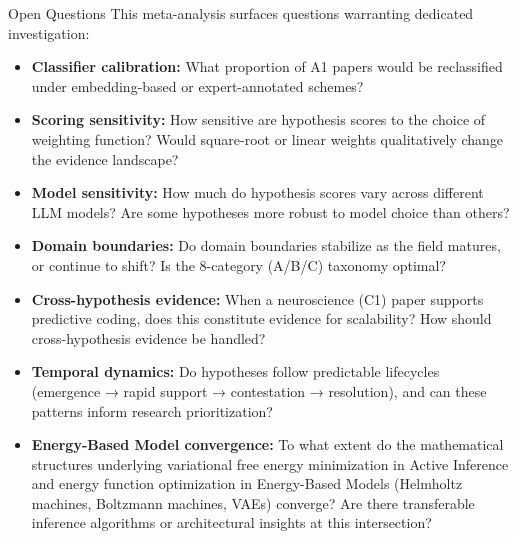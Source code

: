 \documentclass[
  ignorenonframetext,
]{beamer}
\providecommand{\tightlist}{%
  \setlength{\itemsep}{0pt}\setlength{\parskip}{0pt}}
\begin{document}
\begin{frame}{Open Questions}
\protect{}\label{open-questions}
This meta-analysis surfaces questions warranting dedicated
investigation:

\begin{itemize}
\tightlist
\item
  \textbf{Classifier calibration:} What proportion of A1 papers would be
  reclassified under embedding-based or expert-annotated schemes?
\item
  \textbf{Scoring sensitivity:} How sensitive are hypothesis scores to
  the choice of weighting function? Would square-root or linear weights
  qualitatively change the evidence landscape?
\item
  \textbf{Model sensitivity:} How much do hypothesis scores vary across
  different LLM models? Are some hypotheses more robust to model choice
  than others?
\item
  \textbf{Domain boundaries:} Do domain boundaries stabilize as the
  field matures, or continue to shift? Is the 8-category (A/B/C)
  taxonomy optimal?
\item
  \textbf{Cross-hypothesis evidence:} When a neuroscience (C1) paper
  supports predictive coding, does this constitute evidence for
  scalability? How should cross-hypothesis evidence be handled?
\item
  \textbf{Temporal dynamics:} Do hypotheses follow predictable
  lifecycles (emergence → rapid support → contestation → resolution),
  and can these patterns inform research prioritization?
\item
  \textbf{Energy-Based Model convergence:} To what extent do the
  mathematical structures underlying variational free energy
  minimization in Active Inference and energy function optimization in
  Energy-Based Models (Helmholtz machines, Boltzmann machines, VAEs)
  converge? Are there transferable inference algorithms or architectural
  insights at this intersection?
\end{itemize}
\end{frame}
\end{document}
